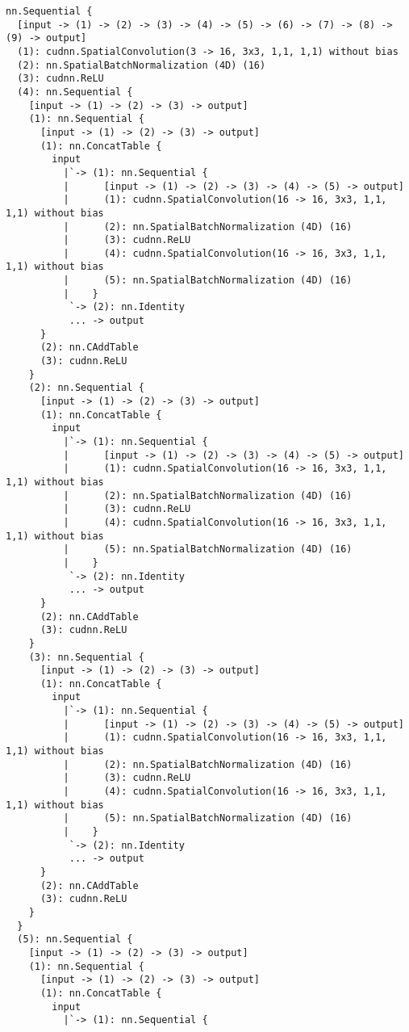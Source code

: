 \begin{lstlisting}[language={[5.2]Lua}]
nn.Sequential {
  [input -> (1) -> (2) -> (3) -> (4) -> (5) -> (6) -> (7) -> (8) -> (9) -> output]
  (1): cudnn.SpatialConvolution(3 -> 16, 3x3, 1,1, 1,1) without bias
  (2): nn.SpatialBatchNormalization (4D) (16)
  (3): cudnn.ReLU
  (4): nn.Sequential {
    [input -> (1) -> (2) -> (3) -> output]
    (1): nn.Sequential {
      [input -> (1) -> (2) -> (3) -> output]
      (1): nn.ConcatTable {
        input
          |`-> (1): nn.Sequential {
          |      [input -> (1) -> (2) -> (3) -> (4) -> (5) -> output]
          |      (1): cudnn.SpatialConvolution(16 -> 16, 3x3, 1,1, 1,1) without bias
          |      (2): nn.SpatialBatchNormalization (4D) (16)
          |      (3): cudnn.ReLU
          |      (4): cudnn.SpatialConvolution(16 -> 16, 3x3, 1,1, 1,1) without bias
          |      (5): nn.SpatialBatchNormalization (4D) (16)
          |    }
           `-> (2): nn.Identity
           ... -> output
      }
      (2): nn.CAddTable
      (3): cudnn.ReLU
    }
    (2): nn.Sequential {
      [input -> (1) -> (2) -> (3) -> output]
      (1): nn.ConcatTable {
        input
          |`-> (1): nn.Sequential {
          |      [input -> (1) -> (2) -> (3) -> (4) -> (5) -> output]
          |      (1): cudnn.SpatialConvolution(16 -> 16, 3x3, 1,1, 1,1) without bias
          |      (2): nn.SpatialBatchNormalization (4D) (16)
          |      (3): cudnn.ReLU
          |      (4): cudnn.SpatialConvolution(16 -> 16, 3x3, 1,1, 1,1) without bias
          |      (5): nn.SpatialBatchNormalization (4D) (16)
          |    }
           `-> (2): nn.Identity
           ... -> output
      }
      (2): nn.CAddTable
      (3): cudnn.ReLU
    }
    (3): nn.Sequential {
      [input -> (1) -> (2) -> (3) -> output]
      (1): nn.ConcatTable {
        input
          |`-> (1): nn.Sequential {
          |      [input -> (1) -> (2) -> (3) -> (4) -> (5) -> output]
          |      (1): cudnn.SpatialConvolution(16 -> 16, 3x3, 1,1, 1,1) without bias
          |      (2): nn.SpatialBatchNormalization (4D) (16)
          |      (3): cudnn.ReLU
          |      (4): cudnn.SpatialConvolution(16 -> 16, 3x3, 1,1, 1,1) without bias
          |      (5): nn.SpatialBatchNormalization (4D) (16)
          |    }
           `-> (2): nn.Identity
           ... -> output
      }
      (2): nn.CAddTable
      (3): cudnn.ReLU
    }
  }
  (5): nn.Sequential {
    [input -> (1) -> (2) -> (3) -> output]
    (1): nn.Sequential {
      [input -> (1) -> (2) -> (3) -> output]
      (1): nn.ConcatTable {
        input
          |`-> (1): nn.Sequential {

\end{lstlisting}

